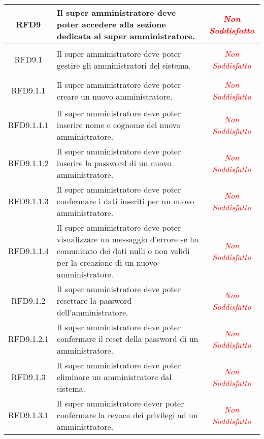 \begin{longtable}{|c|>{\centering}m{7cm}|c|}
\hypertarget{RFD9}{RFD9} & Il super amministratore deve poter accedere alla sezione dedicata al super amministratore. & \textcolor{Red}{\textit{Non Soddisfatto}}\\ \hline

\hypertarget{RFD9.1}{RFD9.1} & Il super amministratore deve poter gestire gli amministratori del sistema. & \textcolor{Red}{\textit{Non Soddisfatto}}\\ \hline

\hypertarget{RFD9.1.1}{RFD9.1.1} & Il super amministratore deve poter creare un nuovo amministratore. & \textcolor{Red}{\textit{Non Soddisfatto}}\\ \hline

\hypertarget{RFD9.1.1.1}{RFD9.1.1.1} & Il super amministratore deve poter inserire nome e cognome del nuovo amministratore. & \textcolor{Red}{\textit{Non Soddisfatto}}\\ \hline

\hypertarget{RFD9.1.1.2}{RFD9.1.1.2} & Il super amministratore deve poter inserire la password di un nuovo amministratore. & \textcolor{Red}{\textit{Non Soddisfatto}}\\ \hline

\hypertarget{RFD9.1.1.3}{RFD9.1.1.3} & Il super amministratore deve poter confermare i dati inseriti per un nuovo amministratore. & \textcolor{Red}{\textit{Non Soddisfatto}}\\ \hline

\hypertarget{RFD9.1.1.4}{RFD9.1.1.4} & Il super amministratore deve poter visualizzare un messaggio d'errore se ha comunicato dei dati nulli o non validi per la creazione di un nuovo amministratore. & \textcolor{Red}{\textit{Non Soddisfatto}}\\ \hline

\hypertarget{RFD9.1.2}{RFD9.1.2} & Il super amministratore deve poter resettare la password dell'amministratore. & \textcolor{Red}{\textit{Non Soddisfatto}}\\ \hline

\hypertarget{RFD9.1.2.1}{RFD9.1.2.1} & Il super amministratore deve poter confermare il reset della password di un amministratore. & \textcolor{Red}{\textit{Non Soddisfatto}}\\ \hline

\hypertarget{RFD9.1.3}{RFD9.1.3} & Il super amministratore deve poter eliminare un amministratore dal sistema. & \textcolor{Red}{\textit{Non Soddisfatto}}\\ \hline

\hypertarget{RFD9.1.3.1}{RFD9.1.3.1} & Il super amministratore dever poter confermare la revoca dei privilegi ad un amministratore. & \textcolor{Red}{\textit{Non Soddisfatto}}\\ \hline


\end{longtable}
